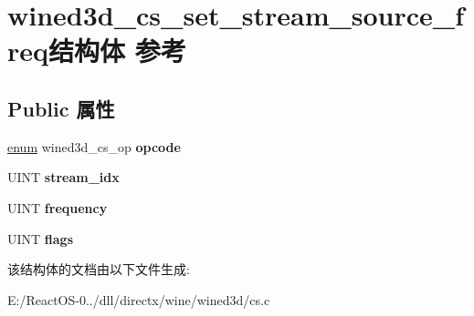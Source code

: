 \hypertarget{structwined3d__cs__set__stream__source__freq}{}\section{wined3d\+\_\+cs\+\_\+set\+\_\+stream\+\_\+source\+\_\+freq结构体 参考}
\label{structwined3d__cs__set__stream__source__freq}
\subsection*{Public 属性}
\begin{DoxyCompactItemize}
\item 
\mbox{\label{structwined3d__cs__set__stream__source__freq_a846d55c15fce3e2f32614fc4b857f59d}} 
\hyperlink{interfaceenum}{enum} wined3d\+\_\+cs\+\_\+op {\bfseries opcode}
\item 
\mbox{\label{structwined3d__cs__set__stream__source__freq_a9b547dc37ae691aff3eec43f2e32685b}} 
U\+I\+NT {\bfseries stream\+\_\+idx}
\item 
\mbox{\label{structwined3d__cs__set__stream__source__freq_a0f94c54b100d2adb9bdc593b5b5c479a}} 
U\+I\+NT {\bfseries frequency}
\item 
\mbox{\label{structwined3d__cs__set__stream__source__freq_a296704a8ba4d92c6adb99f1e75e28c73}} 
U\+I\+NT {\bfseries flags}
\end{DoxyCompactItemize}


该结构体的文档由以下文件生成\+:\begin{DoxyCompactItemize}
\item 
E\+:/\+React\+O\+S-\/0../dll/directx/wine/wined3d/cs.\+c\end{DoxyCompactItemize}
